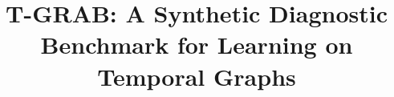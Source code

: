 \documentclass[sigconf]{acmart}
\begin{document}
\title{T-GRAB: A Synthetic Diagnostic Benchmark for Learning on Temporal Graphs}









\end{document}
